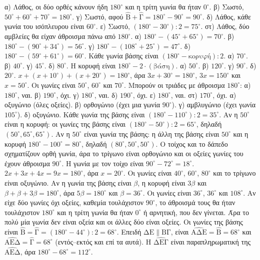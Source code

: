  α) Λάθος, οι δύο ορθές κάνουν ήδη $180^\circ$ και η τρίτη γωνία θα ήταν $0^\circ$. β) Σωστό, $50^\circ+60^\circ+70^\circ=180^\circ$. γ) Σωστό, αφού $\hat{\mathrm{Β}}+\hat{\mathrm{Γ}}=180^\circ-90^\circ=90^\circ$. δ) Λάθος, κάθε γωνία του ισόπλευρου είναι $60^\circ$. ε) Σωστό, $(180^\circ-30^\circ):2=75^\circ$. στ) Λάθος, δύο αμβλείες θα είχαν άθροισμα πάνω από $180^\circ$.
 α) $180^\circ-(45^\circ+65^\circ)=70^\circ$. β) $180^\circ-(90^\circ+34^\circ)=56^\circ$. γ) $180^\circ-(108^\circ+25^\circ)=47^\circ$. δ) $180^\circ-(59^\circ+61^\circ)=60^\circ$.
 Κάθε γωνία βάσης είναι $(180^\circ-\text{κορυφή}):2$. α) $70^\circ$. β) $40^\circ$. γ) $45^\circ$. δ) $80^\circ$.
 Η κορυφή είναι $180^\circ-2\cdot(\text{βάση})$. α) $50^\circ$. β) $120^\circ$. γ) $90^\circ$. δ) $20^\circ$.
 $x+(x+10^\circ)+(x+20^\circ)=180^\circ$, άρα $3x+30^\circ=180^\circ$, $3x=150^\circ$ και $x=50^\circ$. Οι γωνίες είναι $50^\circ$, $60^\circ$ και $70^\circ$.
 Μπορούν οι τριάδες με άθροισμα $180^\circ$: α) $180^\circ$, ναι. β) $190^\circ$, όχι. γ) $180^\circ$, ναι. δ) $190^\circ$, όχι. ε) $180^\circ$, ναι. στ) $170^\circ$, όχι.
 α) οξυγώνιο (όλες οξείες). β) ορθογώνιο (έχει μια γωνία $90^\circ$). γ) αμβλυγώνιο (έχει γωνία $105^\circ$). δ) οξυγώνιο.
 Κάθε γωνία της βάσης είναι $(180^\circ-110^\circ):2=35^\circ$.
 Αν η $50^\circ$ είναι η κορυφή: οι γωνίες της βάσης είναι $(180^\circ-50^\circ):2=65^\circ$, δηλαδή $(50^\circ,65^\circ,65^\circ)$. Αν η $50^\circ$ είναι γωνία της βάσης: η άλλη της βάσης είναι $50^\circ$ και η κορυφή $180^\circ-100^\circ=80^\circ$, δηλαδή $(80^\circ,50^\circ,50^\circ)$.
 Ο τοίχος και το δάπεδο σχηματίζουν ορθή γωνία, άρα το τρίγωνο είναι ορθογώνιο και οι οξείες γωνίες του έχουν άθροισμα $90^\circ$. Η γωνία με τον τοίχο είναι $90^\circ-72^\circ=18^\circ$.
 $2x+3x+4x=9x=180^\circ$, άρα $x=20^\circ$. Οι γωνίες είναι $40^\circ$, $60^\circ$, $80^\circ$ και το τρίγωνο είναι οξυγώνιο.
 Αν η γωνία της βάσης είναι $\beta$, η κορυφή είναι $3\beta$ και $\beta+\beta+3\beta=180^\circ$, άρα $5\beta=180^\circ$ και $\beta=36^\circ$. Οι γωνίες είναι $36^\circ$, $36^\circ$ και $108^\circ$.
 Αν είχε δύο γωνίες όχι οξείες, καθεμία τουλάχιστον $90^\circ$, το άθροισμά τους θα ήταν τουλάχιστον $180^\circ$ και η τρίτη γωνία θα ήταν $0^\circ$ ή αρνητική, που δεν γίνεται. Άρα το πολύ μία γωνία δεν είναι οξεία και οι άλλες δύο είναι οξείες.
 Οι γωνίες της βάσης είναι $\hat{\mathrm{Β}}=\hat{\mathrm{Γ}}=(180^\circ-44^\circ):2=68^\circ$. Επειδή $\mathrm{ΔΕ}\parallel\mathrm{ΒΓ}$, είναι $\widehat{\mathrm{ΑΔΕ}}=\hat{\mathrm{Β}}=68^\circ$ και $\widehat{\mathrm{ΑΕΔ}}=\hat{\mathrm{Γ}}=68^\circ$ (εντός--εκτός και επί τα αυτά). Η $\widehat{\mathrm{ΔΕΓ}}$ είναι παραπληρωματική της $\widehat{\mathrm{ΑΕΔ}}$, άρα $180^\circ-68^\circ=112^\circ$.
